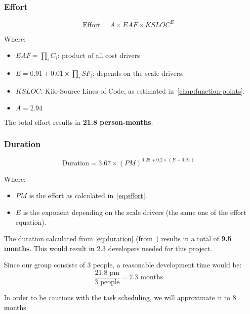 \subsubsection{Effort}
\label{sec:effort}

\begin{equation}
    \textrm{Effort} = A \times EAF \times KSLOC^E
    \label{eq:effort}
\end{equation}

Where:
\begin{itemize}
    \item $EAF = \prod_i C_i$: product of all cost drivers
    \item $E=0.91 + 0.01 \times \prod_{i}SF_i$: depends on the scale drivers.
    \item $KSLOC$: Kilo-Source Lines of Code, as estimated in~\autoref{chap:function-points}.
    \item $A=2.94$
\end{itemize}

The total effort results in \textbf{21.8 person-months}.

\subsubsection{Duration}

\begin{equation}
    \textrm{Duration} = 3.67 \times (PM)^{0.28 + 0.2 \times (E-0.91)}
    \label{eq:duration}
\end{equation}

Where:
\begin{itemize}
    \item $PM$ is the effort as calculated in~\autoref{eq:effort}.
    \item $E$ is the exponent depending on the scale drivers (the same one of the effort equation).
\end{itemize}

The duration calculated from \autoref{eq:duration} (from~\cite{cocomo-manual}) results in a total of \textbf{9.5 months}.
This would result in 2.3 developers needed for this project.

Since our group consists of 3 people, a reasonable development time would be:
\[
    \frac{21.8\textrm{ pm}}{3 \textrm{ people}}=7.3\textrm{ months}
\]

In order to be cautious with the task scheduling, we will approximate it to 8 months.